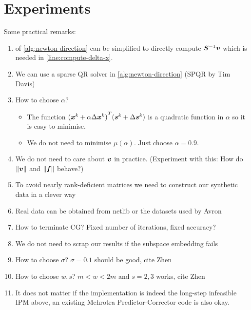 \chapter{Experiments}\label{chap:experiments}

Some practical remarks:
\begin{enumerate}
  \item {} of \cref{alg:newton-direction} can be simplified to directly compute \(\bm{S}^{-1}\bm{v}\) which is needed in \cref{line:compute-delta-x}.
  \item We can use a sparse QR solver in \cref{alg:newton-direction} (SPQR by Tim Davis)
  \item How to choose \(\alpha\)?
  \begin{itemize}
    \item The function \({(\bm{x}^k + \alpha \Delta\bm{x}^k)}^T (\bm{s}^k + \Delta\bm{s}^k)\) is a quadratic function in \(\alpha\) so it is easy to minimise.
    \item We do not need to minimise \(\mu(\alpha)\). Just choose \(\alpha = 0.9\).
  \end{itemize}
  \item We do not need to care about \(\bm{v}\) in practice. (Experiment with this: How do \(\lVert \bm{v} \rVert\) and \(\lVert \bm{f} \rVert\) behave?)
  \item To avoid nearly rank-deficient matrices we need to construct our synthetic data in a clever way
  \item Real data can be obtained from netlib or the datasets used by Avron
  \item How to terminate CG\@? Fixed number of iterations, fixed accuracy?
  \item We do not need to scrap our results if the subspace embedding fails
  \item How to choose \(\sigma\)? \(\sigma = 0.1\) should be good, cite Zhen
  \item How to choose \(w, s\)? \(m < w < 2m\) and \(s = 2, 3\) works, cite Zhen
  \item It does not matter if the implementation is indeed the long-step infeasible IPM above, an existing Mehrotra Predictor-Corrector code is also okay.
\end{enumerate}
